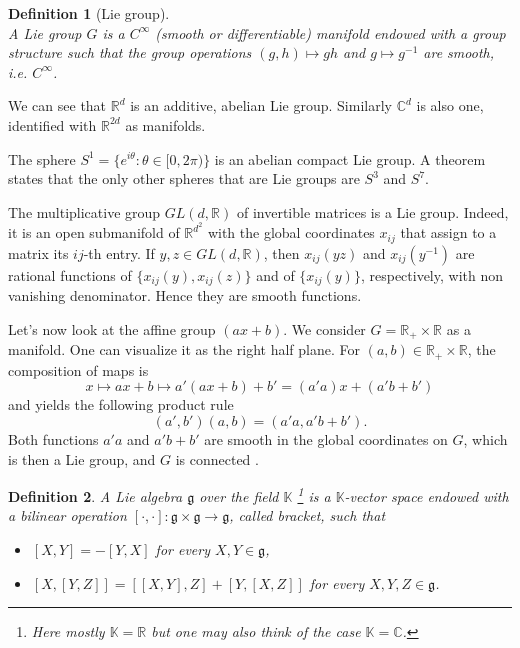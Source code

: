 \documentclass[a4paper,11pt]{article} %
\numberwithin{equation}{section} %
\numberwithin{figure}{section} %
\newtheorem{dfn}{Definition}
\begin{document}
\begin{dfn}[Lie group] \cite[Def. 12.38, p. 564]{Moretti2012} \\  
A Lie group $G$ is a $C^\infty$  (smooth or differentiable) manifold endowed with a  group structure such that the group operations $(g,h)\mapsto gh$ and $g\mapsto g^{-1}$ are smooth, i.e. $C^\infty$.
\end{dfn}

We can see that $\mathbb{R}^d$ is an additive, abelian Lie group. Similarly $\mathbb{C}^d$ is also one, identified with $\mathbb{R}^{2d}$ as manifolds. 

The sphere $S^1=\{e^{i\theta}:\theta\in[0,2\pi)\}$ is an abelian compact Lie group. A theorem states that the only other spheres that are Lie groups are $S^3$ and $S^7$. 

The multiplicative group $GL(d,\mathbb{R})$ of invertible  matrices is a Lie group. Indeed, it is an open submanifold of $\mathbb{R}^{d^2}$ with the global coordinates $x_{ij}$ that assign to a matrix its ${ij}$-th entry. If $y,z\in GL(d,\mathbb{R})$, then  $x_{ij}(yz)$ and $x_{ij}(y^{-1})$ are rational functions of $\{x_{ij}(y),x_{ij}(z)\}$ and of  $\{x_{ij}(y)\}$, respectively, with non vanishing denominator. Hence they are smooth functions. 

Let's now look at the affine group $(ax+b)$. We consider $G=\mathbb{R}_+\times\mathbb{R}$ as a manifold. One can visualize it as the right half plane. For $(a,b) \in \mathbb{R}_+ \times \mathbb{R}$, the composition of maps is 
\begin{equation}
x\mapsto ax+b\mapsto a'(ax+b)+b'=(a'a)x+(a'b+b')
\end{equation}
and yields the following product rule
\begin{equation}
(a',b')(a,b)=(a'a,a'b+b').
\end{equation}
Both functions $a'a$ and $a'b+b'$ are smooth in the global coordinates on $G$, which is then a Lie group, and $G$ is connected \cite[Def. 1.26, .15]{Moretti2012}. 

\begin{dfn} 
A Lie algebra $\mathfrak{g}$ over the field $\mathbb{K}$ \footnote{Here mostly $\mathbb{K}=\mathbb{R}$ but one may also think of the case $\mathbb{K}=\mathbb{C}$.} is a $\mathbb{K}$-vector space endowed with a bilinear operation $[\cdot,\cdot]:\mathfrak{g}\times\mathfrak{g}\rightarrow\mathfrak{g}$, called bracket, such that 
\begin{itemize}
\item[(i)] $[X,Y]=-[Y,X]$ for every $X,Y\in\mathfrak{g}$,
\item[(ii)] $[X,[Y,Z]]=[[X,Y],Z]+[Y,[X,Z]]$ for every $X,Y,Z\in\mathfrak{g}$.
\end{itemize}
\end{dfn}
\end{document}
